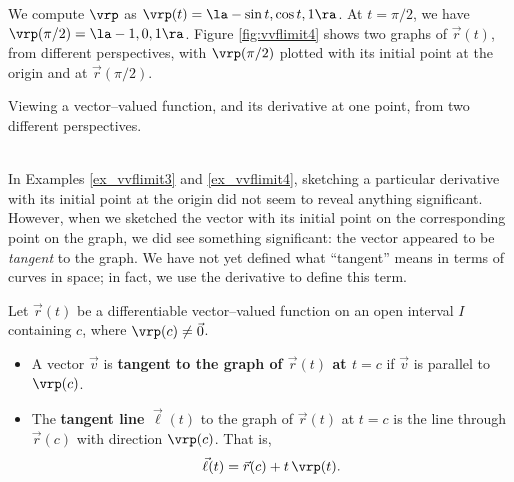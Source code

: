 {We compute $\vrp$ as $\vrp(t) = \la -\sin t, \cos t, 1\ra$. At $t= \pi/2$, we have $\vrp(\pi/2) = \la -1,0,1\ra$. Figure \ref{fig:vvflimit4} shows two graphs of $\vec r(t)$, from different perspectives, with $\vrp(\pi/2)$ plotted with its initial point at the origin and at $\vec r(\pi/2)$.
\begin{center}
	\captionsetup{type=figure}\caption{Viewing a vector--valued function, and its derivative at one point, from two different perspectives.} \label{fig:vvflimit4}
\end{center}
\baselineskip
}\\

In Examples \ref{ex_vvflimit3} and \ref{ex_vvflimit4}, sketching a particular derivative with its initial point at the origin did not seem to reveal anything significant. However, when we sketched the vector with its initial point on the corresponding point on the graph, we did see something significant: the vector appeared to be \textit{tangent} to the graph. We have not yet defined what ``tangent'' means in terms of curves in space; in fact, we use the derivative to define this term.

{Let $\vec r(t)$ be a differentiable vector--valued function on an open interval $I$ containing $c$, where $\vrp(c)\neq \vec 0$.
\begin{itemize}
	\item A vector $\vec v$ is \textbf{tangent to the graph of $\vec r(t)$ at $t=c$} if $\vec v$ is parallel to $\vrp(c)$.
	\item	The \textbf{tangent line} $\vec\ell(t)$ to the graph of $\vec r(t)$ at $t=c$ is the line through $\vec r(c)$ with direction $\vrp(c)$. That is, 
	$$\vec \ell(t) = \vec r(c) + t\,\vrp(t).$$
\end{itemize}
}\\

